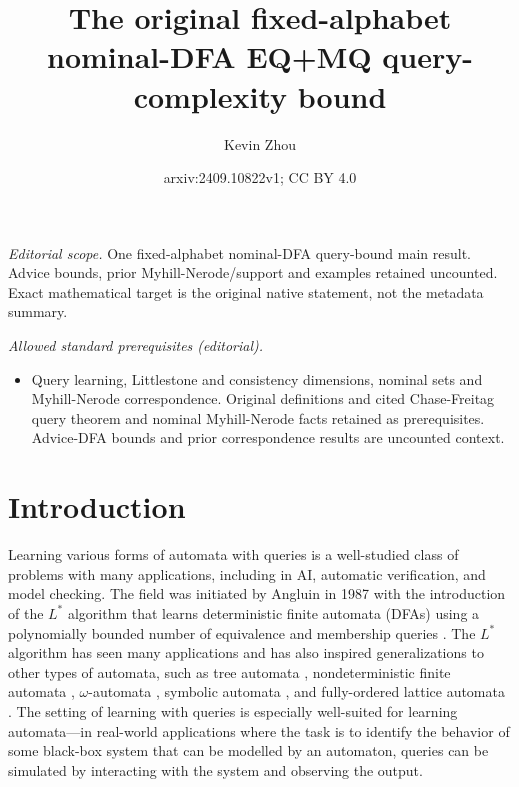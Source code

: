 \documentclass[11pt,a4paper]{amsart}
\title{The original fixed-alphabet nominal-DFA EQ+MQ query-complexity bound}
\author{Kevin Zhou}
\date{arxiv:2409.10822v1; CC BY 4.0}
\theoremstyle{definition}
\begin{document}
\maketitle
\noindent\textit{Editorial scope.} One fixed-alphabet nominal-DFA query-bound main result. Advice bounds, prior Myhill-Nerode/support and examples retained uncounted. Exact mathematical target is the original native statement, not the metadata summary.\par\medskip
\noindent\textit{Allowed standard prerequisites (editorial).}\begin{itemize}
\item Query learning, Littlestone and consistency dimensions, nominal sets and Myhill-Nerode correspondence. Original definitions and cited Chase-Freitag query theorem and nominal Myhill-Nerode facts retained as prerequisites. Advice-DFA bounds and prior correspondence results are uncounted context.
\end{itemize}\medskip
\section{Introduction}

Learning various forms of automata with queries is a well-studied class of problems with many applications, including in AI, automatic verification, and model checking. 
The field was initiated by Angluin in 1987 with the introduction of the $L^*$ algorithm that learns deterministic finite automata (DFAs) using a polynomially bounded number of equivalence and membership queries \cite{angluin:learning-regular-sets}.
The $L^*$ algorithm has seen many applications and has also inspired generalizations to other types of automata, such as tree automata \cite{yasubumi:learning-context-free-grammars}, nondeterministic finite automata \cite{bollig-etal:learning-NFA}, $\omega$-automata \cite{angluin-fisman:learning-regular-omega-languages}, symbolic automata \cite{drews-dantoni:learning-symoblic-automata}, and fully-ordered lattice automata \cite{fisman-saadon:learning-characterizing-fully-ordered-lattice-automata}. 
The setting of learning with queries is especially well-suited for learning automata---in real-world applications where the task is to identify the behavior of some black-box system that can be modelled by an automaton, queries can be simulated by interacting with the system and observing the output.
\end{document}
